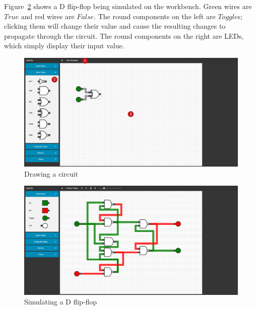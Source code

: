 Figure~\ref{fig:dflopflop} shows a D flip-flop being simulated on the workbench. Green wires are $True$ and red wires are $False$. The round components on the left are $Toggle$s; clicking them will change their value and cause the resulting changes to propagate through the circuit. The round components on the right are LEDs, which simply display their input value.

\begin{figure}[p]
    \centering
    \includegraphics[width=\textheight,angle=90]{labelled.png}
    \caption{Drawing a circuit}
    \label{fig:interface}
\end{figure}

\begin{figure}[p]
    \centering
    \includegraphics[width=\textheight,angle=90]{dflipflop.png}
    \caption{Simulating a D flip-flop}
    \label{fig:dflopflop}
\end{figure}
